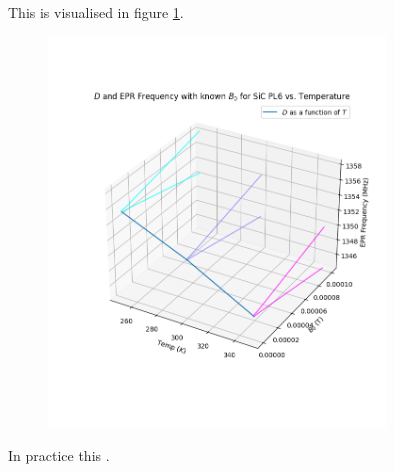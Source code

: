 This is visualised in figure \ref{fig:pl6-3temps}. 

\begin{figure}[h]
    \begin{center}
        \includegraphics[width=0.8\textwidth]{figures/PL6-DvsT-3temps.png}
    \end{center}
    \caption{}\label{fig:pl6-3temps}
\end{figure}

In practice this . 


